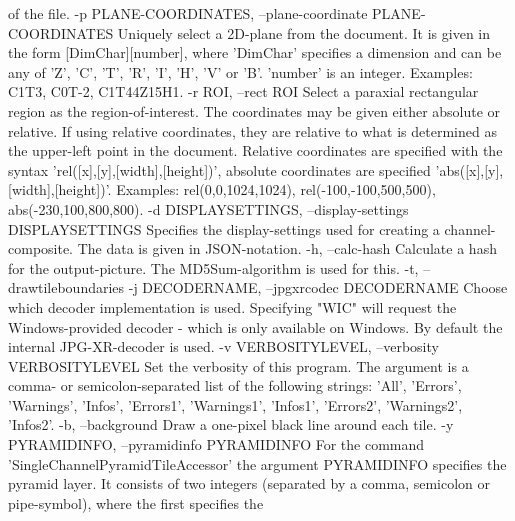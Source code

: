 \begin{DoxyVerb}
                      of the file.
  -p PLANE-COORDINATES, --plane-coordinate PLANE-COORDINATES
                      Uniquely select a 2D-plane from the document. It is given
                      in the form [DimChar][number], where 'DimChar' specifies
                      a dimension and can be any of 'Z', 'C', 'T', 'R', 'I',
                      'H', 'V' or 'B'. 'number' is an integer.
                      Examples: C1T3, C0T-2, C1T44Z15H1.
  -r ROI, --rect ROI
                      Select a paraxial rectangular region as the
                      region-of-interest. The coordinates may be given either
                      absolute or relative. If using relative coordinates, they
                      are relative to what is determined as the upper-left
                      point in the document.
                      Relative coordinates are specified with the syntax
                      'rel([x],[y],[width],[height])', absolute coordinates are
                      specified 'abs([x],[y],[width],[height])'.
                      Examples: rel(0,0,1024,1024), rel(-100,-100,500,500),
                      abs(-230,100,800,800).
  -d DISPLAYSETTINGS, --display-settings DISPLAYSETTINGS
                      Specifies the display-settings used for creating a
                      channel-composite. The data is given in JSON-notation.
  -h, --calc-hash     Calculate a hash for the output-picture. The
                      MD5Sum-algorithm is used for this.
  -t, --drawtileboundaries
  -j DECODERNAME, --jpgxrcodec DECODERNAME
                      Choose which decoder implementation is used. Specifying
                      "WIC" will request the Windows-provided decoder - which
                      is only available on Windows. By default the internal
                      JPG-XR-decoder is used.
  -v VERBOSITYLEVEL, --verbosity VERBOSITYLEVEL
                      Set the verbosity of this program. The argument is a
                      comma- or semicolon-separated list of the following
                      strings: 'All', 'Errors', 'Warnings', 'Infos', 'Errors1',
                      'Warnings1', 'Infos1', 'Errors2', 'Warnings2', 'Infos2'.
  -b, --background    Draw a one-pixel black line around each tile.
  -y PYRAMIDINFO, --pyramidinfo PYRAMIDINFO
                      For the command 'SingleChannelPyramidTileAccessor' the
                      argument PYRAMIDINFO specifies the pyramid layer. It
                      consists of two integers (separated by a comma, semicolon
                      or pipe-symbol), where the first specifies the

\end{DoxyVerb}

